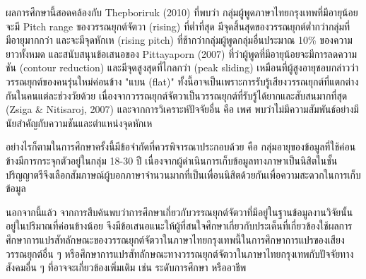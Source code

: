 \documentclass[a4paper]{article}
\begin{document}
    ผลการศึกษานี้สอดคล้องกับ Thepboriruk (2010) ที่พบว่า กลุ่มผู้พูดภาษาไทยกรุงเทพที่มีอายุน้อย จะมี Pitch range ของวรรณยุกต์จัตวา (rising) ที่ต่ำที่สุด มีจุดสิ้นสุดของวรรณยุกต์ต่ำกว่ากลุ่มที่มีอายุมากกว่า และจะมีจุดหักเห (rising pitch) ที่ช้ากว่ากลุ่มผู้พูดกลุ่มอื่นประมาณ 10\% ของความยาวทั้งหมด และสนับสนุนข้อเสนอของ Pittayaporn (2007) ที่ว่าผู้พูดที่มีอายุน้อยจะมีการลดความชัน (contour reduction) และมีจุดสูงสุดที่ไกลกว่า (peak sliding) เหมือนที่ผู้สูงอายุชอบกล่าวว่าวรรณยุกต์ของคนรุ่นใหม่ค่อนข้าง "แบน (flat)" ทั้งนี้อาจเป็นเพราะการรับรู้เสียงวรรณยุกต์ที่แตกต่างกันในคนแต่ละช่วงวัยด้วย เนื่องจากวรรณยุกต์จัตวาเป็นวรรณยุกต์ที่รับรู้ได้ยากและสับสนมากที่สุด (Zsiga \& Nitisaroj, 2007) และจากการวิเคราะห์ปัจจัยอื่น คือ เพศ พบว่าไม่มีความสัมพันธ์อย่างมีนัยสำคัญกับความชันและตำแหน่งจุดหักเห

    อย่างไรก็ตามในการศึกษาครั้งนี้มีข้อจำกัดที่ควรพิจารณาประกอบด้วย คือ กลุ่มอายุของข้อมูลที่ใช้ค่อนข้างมีการกระจุกตัวอยู่ในกลุ่ม 18-30 ปี เนื่องจากผู้ดำเนินการเก็บข้อมูลทางภาษาเป็นนิสิตในชั้นปริญญาตรีจึงเลือกสัมภาษณ์ผู้บอกภาษาจำนวนมากที่เป็นเพื่อนนิสิตด้วยกันเพื่อความสะดวกในการเก็บข้อมูล

    นอกจากนี้แล้ว จากการสืบค้นพบว่าการศึกษาเกี่ยวกับวรรณยุกต์จัตวาที่มีอยู่ในฐานข้อมูลงานวิจัยนั้นอยู่ในปริมาณที่ค่อนข้างน้อย จึงมีข้อเสนอแนะให้ผู้ที่สนใจศึกษาเกี่ยวกับประเด็นที่เกี่ยวข้องใช้ผลการศึกษาการแปรสัทลักษณะของวรรณยุกต์จัตวาในภาษาไทยกรุงเทพนี้ในการศึกษาการแปรของเสียงวรรณยุกต์อื่น ๆ หรือศึกษาการแปรสัทลักษณะทางวรรณยุกต์จัตวาในภาษาไทยกรุงเทพกับปัจจัยทางสังคมอื่น ๆ ที่อาจจะเกี่ยวข้องเพิ่มเติม เช่น ระดับการศึกษา หรืออาชีพ
\end{document}
